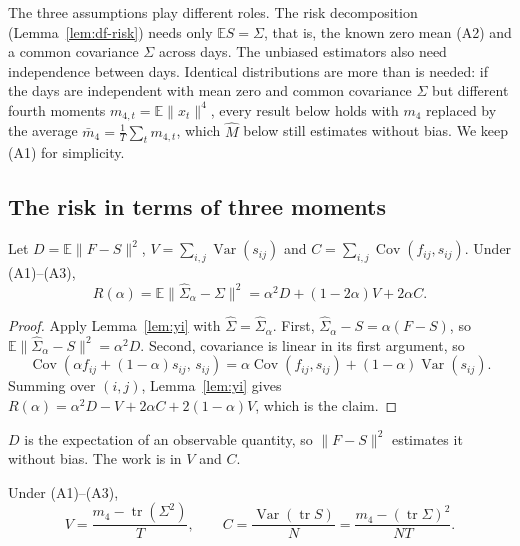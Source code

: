 The three assumptions play different roles. The risk decomposition (Lemma~\ref{lem:df-risk}) needs only $\mathbb{E}S = \Sigma$, that is, the known zero mean (A2) and a common covariance $\Sigma$ across days. The unbiased estimators also need independence between days. Identical distributions are more than is needed: if the days are independent with mean zero and common covariance $\Sigma$ but different fourth moments $m_{4,t} = \mathbb{E}\|x_t\|^4$, every result below holds with $m_4$ replaced by the average $\bar m_4 = \frac{1}{T}\sum_t m_{4,t}$, which $\hat M$ below still estimates without bias. We keep (A1) for simplicity.

\subsection{The risk in terms of three moments}

\begin{lemma}\label{lem:df-risk}
Let $D = \mathbb{E}\|F - S\|^2$, $V = \sum_{i,j}\operatorname{Var}(s_{ij})$ and $C = \sum_{i,j}\operatorname{Cov}(f_{ij}, s_{ij})$. Under (A1)--(A3),
\[
  R(\alpha) = \mathbb{E}\|\hat\Sigma_\alpha - \Sigma\|^2 = \alpha^2 D + (1 - 2\alpha)V + 2\alpha C .
\]
\end{lemma}

\begin{proof}
Apply Lemma~\ref{lem:yi} with $\hat\Sigma = \hat\Sigma_\alpha$. First, $\hat\Sigma_\alpha - S = \alpha(F - S)$, so $\mathbb{E}\|\hat\Sigma_\alpha - S\|^2 = \alpha^2 D$. Second, covariance is linear in its first argument, so
\[
  \operatorname{Cov}\left(\alpha f_{ij} + (1-\alpha)s_{ij},\, s_{ij}\right) = \alpha\operatorname{Cov}(f_{ij}, s_{ij}) + (1-\alpha)\operatorname{Var}(s_{ij}).
\]
Summing over $(i,j)$, Lemma~\ref{lem:yi} gives $R(\alpha) = \alpha^2 D - V + 2\alpha C + 2(1-\alpha)V$, which is the claim.
\end{proof}

$D$ is the expectation of an observable quantity, so $\|F - S\|^2$ estimates it without bias. The work is in $V$ and $C$.

\begin{lemma}\label{lem:df-moments}
Under (A1)--(A3),
\[
  V = \frac{m_4 - \operatorname{tr}(\Sigma^2)}{T}, \qquad
  C = \frac{\operatorname{Var}(\operatorname{tr}S)}{N} = \frac{m_4 - (\operatorname{tr}\Sigma)^2}{NT}.
\]
\end{lemma}

